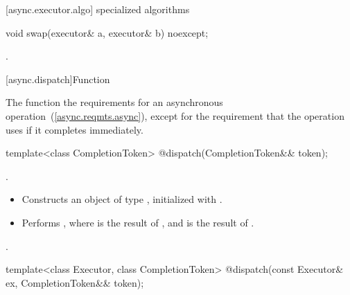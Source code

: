 [async.executor.algo]{ specialized algorithms}

%
\begin{itemdecl}
void swap(executor& a, executor& b) noexcept;
\end{itemdecl}

\begin{itemdescr}
\pnum
\effects {}.
\end{itemdescr}




[async.dispatch]{Function }

%
\pnum
\begin{note} The function   the requirements for an asynchronous operation~(\ref{async.reqmts.async}), except for the requirement that the operation uses  if it completes immediately. \end{note}

\begin{itemdecl}
template<class CompletionToken>
  @\DEDUCED@ dispatch(CompletionToken&& token);
\end{itemdecl}

\begin{itemdescr}
\pnum
\completionsig {}.

\pnum
\effects
\begin{itemize}
\item
 Constructs an object  of type , initialized with .
\item
 Performs , where  is the result of , and  is the result of .
\end{itemize}

\pnum
\returns {}.
\end{itemdescr}

\begin{itemdecl}
template<class Executor, class CompletionToken>
  @\DEDUCED@ dispatch(const Executor& ex, CompletionToken&& token);
\end{itemdecl}

